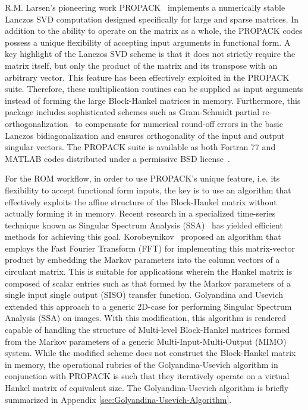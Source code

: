 R.M. Larsen's pioneering work PROPACK~\citep{Larsen2014} implements
a numerically stable Lanczos SVD computation designed specifically
for large and sparse matrices. In addition to the ability to operate
on the matrix as a whole, the PROPACK codes possess a unique flexibility
of accepting input arguments in functional form. A key highlight of
the Lanczos SVD scheme is that it does not strictly require the matrix
itself, but only the product of the matrix and its transpose with
an arbitrary vector. This feature has been effectively exploited in
the PROPACK suite. Therefore, these multiplication routines can be
supplied as input arguments instead of forming the large Block-Hankel
matrices in memory. Furthermore, this package includes sophisticated
schemes such as Gram-Schmidt partial re-orthogonalization~\citep{Bjoerck1994}
to compensate for numerical round-off errors in the basic Lanczos
bidiagonalization and ensures orthogonality of the input and output
singular vectors. The PROPACK suite is available as both Fortran 77
and MATLAB codes distributed under a permissive BSD license~\citep{Rosen2005}.

For the ROM workflow, in order to use PROPACK's unique feature, i.e.
its flexibility to accept functional form inputs, the key is to use
an algorithm that effectively exploits the affine structure of the
Block-Hankel matrix without actually forming it in memory. Recent
research in a specialized time-series technique known as Singular
Spectrum Analysis (SSA)~\citep{ElsnerTsonis2013} has yielded efficient
methods for achieving this goal. Korobeynikov~\citep{Korobeynikov2009}
proposed an algorithm that employs the Fast Fourier Transform (FFT)
for implementing this matrix-vector product by embedding the Markov
parameters into the column vectors of a circulant matrix. This is
suitable for applications wherein the Hankel matrix is composed of
scalar entries such as that formed by the Markov parameters of a single
input single output (SISO) transfer function. Golyandina and Usevich~\citep{GolyandinaKorobeynikovShlemovEtAl2015,GolyandinaUsevich2004}
extended this approach to a generic 2D-case for performing Singular
Spectrum Analysis (SSA) on images. With this modification, this algorithm
is rendered capable of handling the structure of Multi-level Block-Hankel
matrices formed from the Markov parameters of a generic Multi-Input-Multi-Output
(MIMO) system. While the modified scheme does not construct the Block-Hankel
matrix in memory, the operational rubrics of the Golyandina-Usevich
algorithm in conjunction with PROPACK is such that they iteratively
operate on a virtual Hankel matrix of equivalent size. The Golyandina-Usevich
algorithm is briefly summarized in Appendix \ref{sec:Golyandina-Usevich-Algorithm}.

